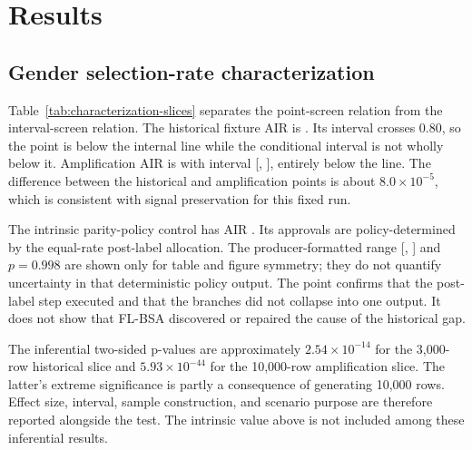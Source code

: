 \section{Results}

\subsection{Gender selection-rate characterization}

Table~\ref{tab:characterization-slices} separates the point-screen relation from the interval-screen
relation. The historical fixture AIR is \HistoricalAIR{}. Its interval crosses 0.80, so the point
is below the internal line while the conditional interval is not wholly below it. Amplification AIR
is \AmplificationAIR{} with interval [\AmplificationAIRLower{}, \AmplificationAIRUpper{}], entirely
below the line. The difference between the historical and amplification points is about
$8.0\times10^{-5}$, which is consistent with signal preservation for this fixed run.

\begin{table}[htbp]
  \centering
  \small
  
  \caption{Gender AIR by slice. ``Relation'' is descriptive: it is not a legal or product
  pass/fail state. Historical and amplification ranges are conditional 95\% AIR intervals. The
  intrinsic range is reproduced only for format symmetry and is not inferential.}
  \label{tab:characterization-slices}
\end{table}

The intrinsic parity-policy control has AIR \IntrinsicAIR{}. Its approvals are policy-determined
by the equal-rate post-label allocation. The producer-formatted range
[\IntrinsicAIRLower{}, \IntrinsicAIRUpper{}] and $p=0.998$ are shown only for table and figure
symmetry; they do not quantify uncertainty in that deterministic policy output. The point confirms
that the post-label step executed and that the branches did not collapse into one output. It does
not show that FL-BSA discovered or repaired the cause of the historical gap.

The inferential two-sided p-values are approximately $2.54\times10^{-14}$ for the 3,000-row
historical slice and $5.93\times10^{-44}$ for the 10,000-row amplification slice. The latter's
extreme significance is partly a consequence of generating 10,000 rows. Effect size, interval,
sample construction, and scenario purpose are therefore reported alongside the test. The
intrinsic value above is not included among these inferential results.

